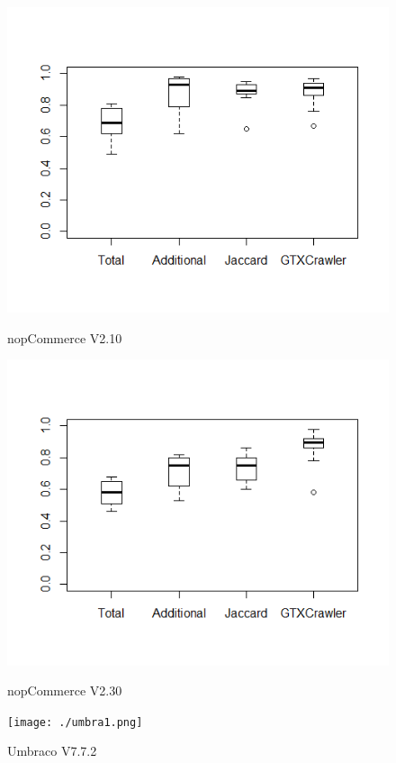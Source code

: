 \begin{figure}[!hb]
	\includegraphics[width=0.95\linewidth]{./nop1.png}
	\caption*{nopCommerce V2.10}
	\label{fig:nop1}
	\endminipage\hfill
	\includegraphics[width=0.95\linewidth]{./nop2.png}
	\caption*{nopCommerce V2.30}
	\label{fig:nop2}
	\endminipage\hfill
	\texttt{[image: ./umbra1.png]}
	\caption*{Umbraco V7.7.2}
	\label{fig:umbra1}
	\endminipage\hfill		
    \vspace*{-10pt}	
\end{figure}

